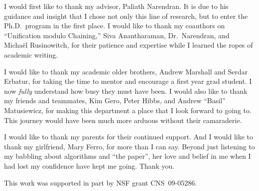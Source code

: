 I would first like to thank my advisor, Paliath Narendran. It is due to his
guidance and insight that I chose not only this line of research, but to enter
the Ph.D.\ program in the first place. I would like to thank my coauthors on
``Unification modulo Chaining,'' Siva Anantharaman, Dr.\ Narendran, and
Micha\"{e}l Rusinowitch, for their patience and expertise while I learned the
ropes of academic writing.

I would like to thank my academic older brothers, Andrew Marshall and Serdar
Erbatur, for taking the time to mentor and encourage a first year grad student.
I now \emph{ful{}ly} understand how busy they must have been. I would also like
to thank my friends and teammates, Kim Gero, Peter Hibbs, and Andrew ``Basil''
Matusiewicz, for making this department a place that I look forward to going
to. This journey would have been much more arduous without their camaraderie.

I would like to thank my parents for their continued support. And I would like
to thank my girlfriend, Mary Ferro, for more than I can say. Beyond just
listening to my babbling about algorithms and ``the paper'', her love and
belief in me when I had lost my confidence have kept me going. Thank you.

\vspace{1em}
This work was supported in part by NSF grant CNS~09-05286.

